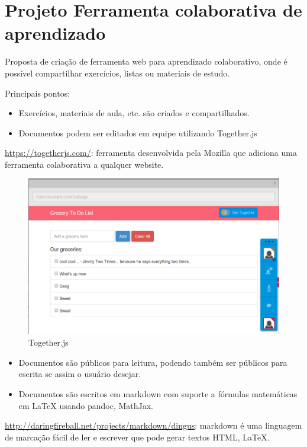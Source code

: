 \section{Projeto Ferramenta colaborativa de aprendizado}

Proposta de criação de ferramenta web para aprendizado colaborativo,
onde é possível compartilhar exercícios, listas ou materiais de estudo.

Principais pontos:

\begin{itemize}
\item
  Exercícios, materiais de aula, etc. são criados e compartilhados.
\item
  Documentos podem ser editados em equipe utilizando Together.js
\end{itemize}
\url{https://togetherjs.com/}: ferramenta desenvolvida pela Mozilla que
adiciona uma ferramenta colaborativa a qualquer website.

\begin{figure}
    \includegraphics[scale=0.5]{img/togetherjs.png}
    \caption{Together.js}
\end{figure}

\begin{itemize}
\item
  Documentos são públicos para leitura, podendo também ser públicos para
  escrita se assim o usuário desejar.
\item
  Documentos são escritos em markdown com suporte a fórmulas matemáticas
  em LaTeX usando pandoc, MathJax.
\end{itemize}
\url{http://daringfireball.net/projects/markdown/dingus}: markdown é uma
linguagem de marcação fácil de ler e escrever que pode gerar textos
HTML, LaTeX.


